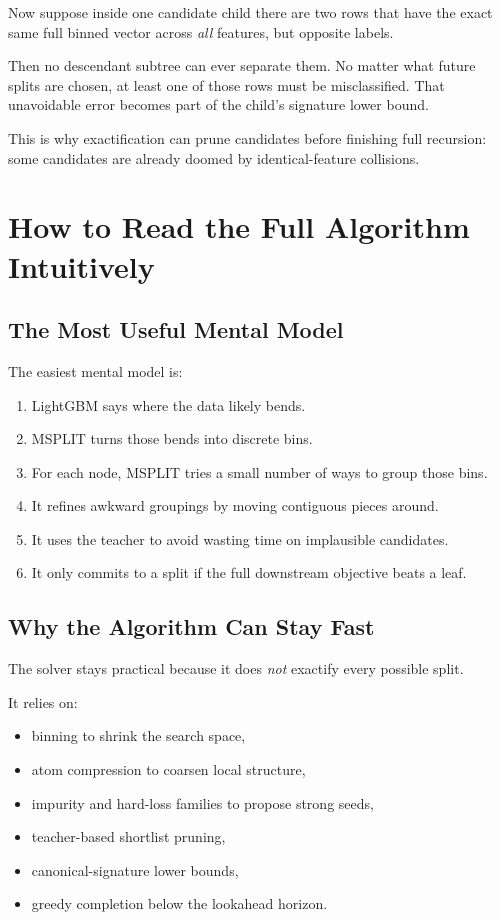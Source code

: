\documentclass[11pt]{article}
\begin{document}
Now suppose inside one candidate child there are two rows that have the exact same full binned vector across \emph{all} features, but opposite labels.

Then no descendant subtree can ever separate them. No matter what future splits are chosen, at least one of those rows must be misclassified. That unavoidable error becomes part of the child's signature lower bound.

This is why exactification can prune candidates before finishing full recursion: some candidates are already doomed by identical-feature collisions.

\section{How to Read the Full Algorithm Intuitively}

\subsection{The Most Useful Mental Model}

The easiest mental model is:

\begin{enumerate}
\item LightGBM says where the data likely bends.
\item MSPLIT turns those bends into discrete bins.
\item For each node, MSPLIT tries a small number of ways to group those bins.
\item It refines awkward groupings by moving contiguous pieces around.
\item It uses the teacher to avoid wasting time on implausible candidates.
\item It only commits to a split if the full downstream objective beats a leaf.
\end{enumerate}

\subsection{Why the Algorithm Can Stay Fast}

The solver stays practical because it does \emph{not} exactify every possible split.

It relies on:

\begin{itemize}
\item binning to shrink the search space,
\item atom compression to coarsen local structure,
\item impurity and hard-loss families to propose strong seeds,
\item teacher-based shortlist pruning,
\item canonical-signature lower bounds,
\item greedy completion below the lookahead horizon.
\end{itemize}
\end{document}
